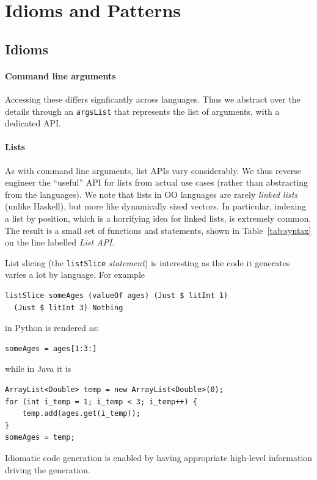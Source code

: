 \documentclass[sigplan,review,prologue,dvipsnames]{acmart}
\begin{document}
\section{Idioms and Patterns} \label{sec:patterns}

\subsection{Idioms}

\paragraph{Command line arguments} Accessing these differs
signficantly across languages.  Thus we abstract over the details through an
\verb|argsList| that represents the list of arguments, with a dedicated API.

\paragraph{Lists}
As with command line arguments, list APIs vary considerably.
We thus reverse engineer the ``useful'' API for lists from actual
use cases (rather than abstracting from the languages). We note that
lists in OO languages are rarely \emph{linked lists} (unlike Haskell), but
more like dynamically sized vectors. In particular, indexing a list by
position, which is a horrifying idea for linked lists, is extremely common.
The result is a small set of functions and statements, shown in
Table~\ref{tab:syntax} on the line labelled \emph{List API}.

List slicing (the \verb|listSlice|
\emph{statement}) is interesting as the code it generates varies
a lot by language.  For example
\begin{lstlisting}
listSlice someAges (valueOf ages) (Just $ litInt 1) 
  (Just $ litInt 3) Nothing
\end{lstlisting}
in Python is rendered as:
\begin{lstlisting}
someAges = ages[1:3:]
\end{lstlisting}
while in Java it is
\begin{lstlisting}
ArrayList<Double> temp = new ArrayList<Double>(0);
for (int i_temp = 1; i_temp < 3; i_temp++) {
    temp.add(ages.get(i_temp));
}
someAges = temp;
\end{lstlisting}
Idiomatic code generation is enabled by having
appropriate high-level information driving the generation.
\end{document}
